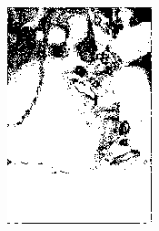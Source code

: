 \begin{figure}[h]
{\begin{subfigure}[b]{0.23\textwidth}
         \includegraphics[width=\textwidth]{images/results/cross_st/clay_dark_med_bayes.png}
     \end{subfigure}}
     

\end{figure}
